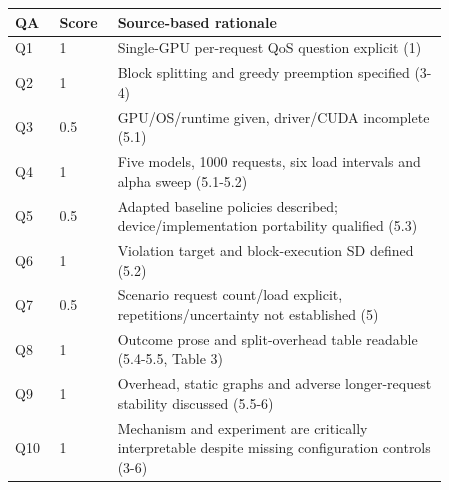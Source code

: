 \begin{longtable}{P{0.09\linewidth}P{0.10\linewidth}P{0.67\linewidth}}
\toprule QA & Score & Source-based rationale\\\midrule\endhead
Q1 & 1 & Single-GPU per-request QoS question explicit (1)\\
Q2 & 1 & Block splitting and greedy preemption specified (3-4)\\
Q3 & 0.5 & GPU/OS/runtime given, driver/CUDA incomplete (5.1)\\
Q4 & 1 & Five models, 1000 requests, six load intervals and alpha sweep (5.1-5.2)\\
Q5 & 0.5 & Adapted baseline policies described; device/implementation portability qualified (5.3)\\
Q6 & 1 & Violation target and block-execution SD defined (5.2)\\
Q7 & 0.5 & Scenario request count/load explicit, repetitions/uncertainty not established (5)\\
Q8 & 1 & Outcome prose and split-overhead table readable (5.4-5.5, Table 3)\\
Q9 & 1 & Overhead, static graphs and adverse longer-request stability discussed (5.5-6)\\
Q10 & 1 & Mechanism and experiment are critically interpretable despite missing configuration controls (3-6)\\
\bottomrule\end{longtable}

